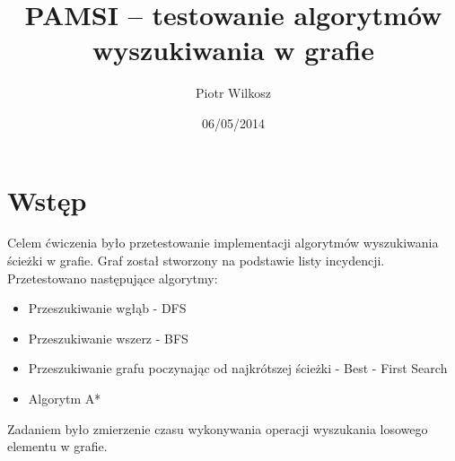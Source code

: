 \documentclass[a4paper,11pt]{article}
\date{06/05/2014}
\title{PAMSI -- testowanie algorytmów wyszukiwania w grafie}
\author{Piotr Wilkosz}
\begin{document}
\maketitle

\section{Wstęp}
Celem ćwiczenia było przetestowanie implementacji algorytmów wyszukiwania ścieżki w grafie. Graf został stworzony 
na podstawie listy incydencji. Przetestowano następujące algorytmy:
  \begin{itemize}
   \item Przeszukiwanie wgłąb - DFS
   \item Przeszukiwanie wszerz - BFS
   \item Przeszukiwanie grafu poczynając od najkrótszej ścieżki - Best - First Search
   \item Algorytm A*
  \end{itemize}
Zadaniem było zmierzenie czasu wykonywania operacji wyszukania losowego elementu w grafie.
\end{document}
